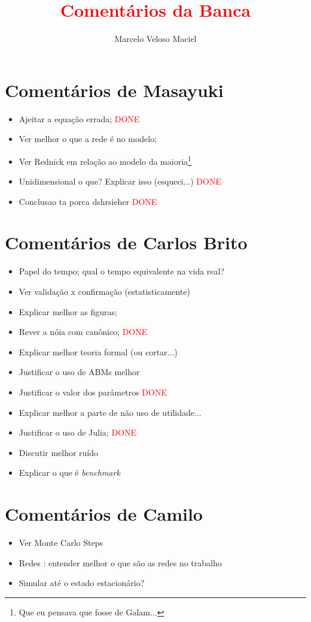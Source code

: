 \documentclass{article}
\title{\textcolor{red}{Comentários da Banca}}
\author{Marcelo Veloso Maciel } \date{}
\begin{document}
\pagecolor{base03}
\color{base1}
\maketitle


\section*{Comentários de Masayuki}
\begin{itemize}
\item Ajeitar a equação errada;  \textcolor{red}{DONE}
\item Ver melhor o que a rede é no modelo;
\item Ver Rednick em relação ao modelo da maioria\footnote{Que eu pensava que
    fosse de Galam...}
\item Unidimensional o que? Explicar isso (esqueci...)  \textcolor{red}{DONE}
\item Conclusao ta porca dshrsieher \textcolor{red}{DONE}
\end{itemize}

\section*{Comentários de Carlos Brito}
\begin{itemize}
\item Papel do tempo; qual o tempo equivalente na vida real?
\item Ver validação x confirmação (estatisticamente)
\item Explicar melhor as figuras;
\item Rever a nóia com canônico; \textcolor{red}{DONE}
\item Explicar melhor teoria formal (ou cortar...)
\item Justificar o uso de ABMs melhor
\item Justificar o valor dos parâmetros  \textcolor{red}{DONE}
\item Explicar melhor a parte de não uso de utilidade...
\item Justificar o uso de Julia; \textcolor{red}{DONE}
\item Discutir melhor ruído
  \item Explicar o que é \textit{benchmark}
\end{itemize}


\section*{Comentários de Camilo}
\begin{itemize}
\item Ver Monte Carlo Steps
\item Redes : entender melhor o que são as redes no trabalho
\item Simular até o estado estacionário?
\end{itemize}
\end{document}
